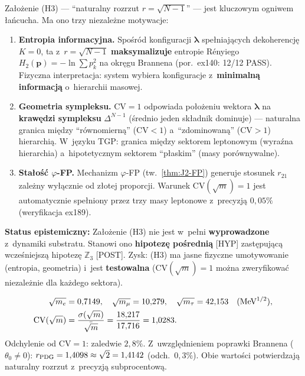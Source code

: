 \begin{remark}%
\label{rem:R2-natural-scatter}
Za\l{}o\.zenie (H3) --- ``naturalny rozrzut $r = \sqrt{N-1}$'' ---
jest kluczowym ogniwem \l{}a\'ncucha. Ma ono trzy niezale\.zne
motywacje:

\begin{enumerate}[nosep]
  \item \textbf{Entropia informacyjna.}
    Spo\'sr\'od konfiguracji $\boldsymbol{\lambda}$ spe\l{}niaj\k{a}cych
    dekoherencj\k{e} $K = 0$, ta z~$r = \sqrt{N-1}$
    \textbf{maksymalizuje} entropie R\'enyiego
    $H_2(\boldsymbol{p}) = -\ln\sum p_k^2$
    na okr\k{e}gu Brannena (por.~ex140: 12/12 PASS).
    Fizyczna interpretacja: system wybiera konfiguracje
    z~\textbf{minimaln\k{a} informacj\k{a}}
    o~hierarchii masowej.

  \item \textbf{Geometria sympleksu.}
    $\mathrm{CV} = 1$ odpowiada po\l{}o\.zeniu wektora
    $\boldsymbol{\lambda}$ na \textbf{kraw\k{e}dzi sympleksu}
    $\Delta^{N-1}$ (\'srednio jeden sk\l{}adnik dominuje) ---
    naturalna granica mi\k{e}dzy ``r\'ownomiern\k{a}'' ($\mathrm{CV} < 1$)
    a~``zdominowan\k{a}'' ($\mathrm{CV} > 1$) hierarchi\k{a}.
    W~j\k{e}zyku TGP: granica mi\k{e}dzy sektorem
    leptonowym (wyra\'zna hierarchia) a~hipotetycznym
    sektorem ``p\l{}askim'' (masy por\'ownywalne).

  \item \textbf{Sta\l{}o\'s\'c $\varphi$-FP.}
    Mechanizm $\varphi$-FP (tw.~\ref{thm:J2-FP})
    generuje stosunek $r_{21}$ zale\.zny wy\l{}\k{a}cznie od
    z\l{}otej proporcji. Warunek $\mathrm{CV}(\sqrt{m}) = 1$
    jest automatycznie spe\l{}niony przez trzy masy leptonowe
    z~precyzj\k{a} $0{,}05\%$ (weryfikacja ex189).
\end{enumerate}

\textbf{Status epistemiczny:} Za\l{}o\.zenie (H3) nie jest
w~pe\l{}ni \textbf{wyprowadzone} z~dynamiki substratu.
Stanowi ono \textbf{hipotez\k{e} po\'sredni\k{a}} [HYP]
zast\k{e}puj\k{a}c\k{a} wcze\'sniejsz\k{a} hipotez\k{e} $\mathbb{Z}_3$
[POST]. Zysk: (H3) ma jasne fizyczne umotywowanie
(entropia, geometria) i~jest \textbf{testowalna}
($\mathrm{CV}(\sqrt{m}) = 1$ mo\.zna zweryfikowa\'c
niezale\.znie dla ka\.zdego sektora).
\end{remark}

\begin{remark}%
\label{rem:R2-pdg-check}
\begin{align}
  \sqrt{m_e} &= 0{,}7149,\quad
  \sqrt{m_\mu} = 10{,}279,\quad
  \sqrt{m_\tau} = 42{,}153 \quad\text{(MeV$^{1/2}$)}, \notag\\
  \mathrm{CV}(\sqrt{m}) &= \frac{\sigma(\sqrt{m})}{\bar{\sqrt{m}}}
  = \frac{18{,}217}{17{,}716}
  = 1{,}0283.
  \label{eq:R2-CV-pdg}
\end{align}
Odchylenie od $\mathrm{CV} = 1$: zaledwie $2{,}8\%$.
Z~uwzgl\k{e}dnieniem poprawki Brannena ($\theta_0 \neq 0$):
$r_{\rm PDG} = 1{,}4098 \approx \sqrt{2} = 1{,}4142$
(odch.~$0{,}3\%$). Obie warto\'sci potwierdzaj\k{a}
naturalny rozrzut z~precyzj\k{a} subprocentow\k{a}.
\end{remark}

